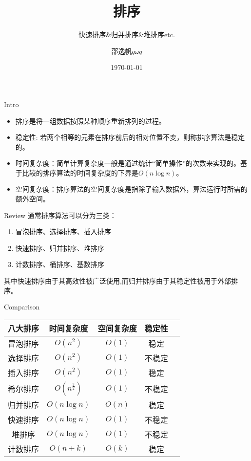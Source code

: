\documentclass{ldr-simple-gray}
\title{排序}
\subtitle{快速排序\&归并排序\&堆排序etc.}
\author{邵逸帆$q\omega q$}
\institute[] {
  23电信基地班\\
  兰州大学算法与程序设计集训队
}
\date{\today}
\begin{document}
  \frame{\titlepage}

  \begin{frame}{Intro}
    \begin{itemize}
      \item 排序是将一组数据按照某种顺序重新排列的过程。
      \item 稳定性: 若两个相等的元素在排序前后的相对位置不变，则称排序算法是稳定的。
      \item 时间复杂度：简单计算复杂度一般是通过统计“简单操作”的次数来实现的。基于比较的排序算法的时间复杂度的下界是$O(n\log n)$。
      \item 空间复杂度：排序算法的空间复杂度是指除了输入数据外，算法运行时所需的额外空间。
    \end{itemize}
  \end{frame}

  \begin{frame}{Review}
    通常排序算法可以分为三类：
    \begin{enumerate}
      \item 冒泡排序、选择排序、插入排序
      \item 快速排序、归并排序、堆排序
      \item 计数排序、桶排序、基数排序
    \end{enumerate}

    其中快速排序由于其高效性被广泛使用,而归并排序由于其稳定性被用于外部排序。
  \end{frame}

  \begin{frame}{Comparison}
    \begin{table}
      \centering
      \begin{tabular}{|c|c|c|c|c|}
        \hline
        八大排序 & 时间复杂度 & 空间复杂度 & 稳定性 \\
        \hline
        冒泡排序 & $O(n^2)$ & $O(1)$ & 稳定 \\
        选择排序 & $O(n^2)$ & $O(1)$ & 不稳定 \\
        插入排序 & $O(n^2)$ & $O(1)$ & 稳定 \\
        希尔排序 & $O(n^{\frac{3}{2}})$ & $O(1)$ & 不稳定 \\
        归并排序 & $O(n\log n)$ & $O(n)$ & 稳定 \\
        快速排序 & $O(n\log n)$ & $O(1)$ & 不稳定 \\
        堆排序 & $O(n\log n)$ & $O(1)$ & 不稳定 \\
        计数排序 & $O(n+k)$ & $O(k)$ & 稳定 \\
        \hline
      \end{tabular}
    \end{table}
  \end{frame}
\end{document}
